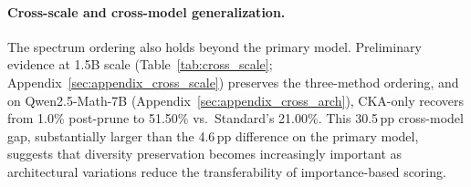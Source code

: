 \paragraph{Cross-scale and cross-model generalization.}
The spectrum ordering also holds beyond the primary model.
Preliminary evidence at 1.5B scale (Table~\ref{tab:cross_scale}; Appendix~\ref{sec:appendix_cross_scale}) preserves the three-method ordering, and on Qwen2.5-Math-7B (Appendix~\ref{sec:appendix_cross_arch}), CKA-only recovers from 1.0\% post-prune to 51.50\% vs.\ Standard's 21.00\%.
This 30.5\,pp cross-model gap, substantially larger than the 4.6\,pp difference on the primary model, suggests that diversity preservation becomes increasingly important as architectural variations reduce the transferability of importance-based scoring.


